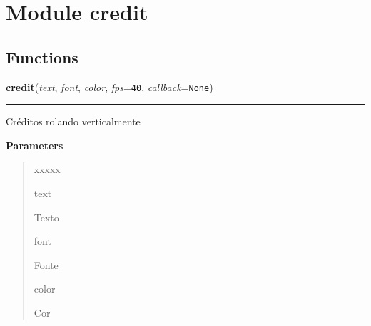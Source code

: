 %
%
%


\section{Module credit}

    \label{credit}


  \subsection{Functions}

    \label{credit:credit}

    \vspace{0.5ex}

\hspace{.8\funcindent}\begin{boxedminipage}{\funcwidth}

    \raggedright \textbf{credit}(\textit{text}, \textit{font}, \textit{color}, \textit{fps}={\tt 40}, \textit{callback}={\tt None})

    \vspace{-1.5ex}

    \rule{\textwidth}{0.5\fboxrule}
\setlength{\parskip}{2ex}
    Créditos rolando verticalmente

\setlength{\parskip}{1ex}
      \textbf{Parameters}
      \vspace{-1ex}

      \begin{quote}
        \begin{Ventry}{xxxxx}

          \item[text]

          Texto

          \item[font]

          Fonte

          \item[color]

          Cor

        \end{Ventry}

      \end{quote}

    \end{boxedminipage}


